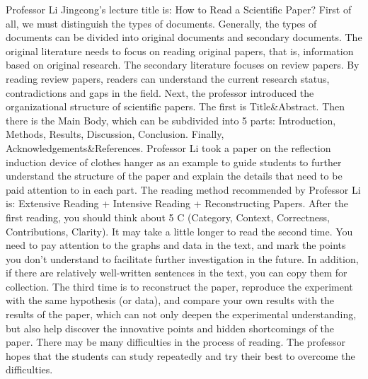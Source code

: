 
Professor Li Jingcong’s lecture title is: How to Read a Scientific Paper? First of all, we must distinguish the types of documents. Generally, the types of documents can be divided into original documents and secondary documents. The original literature needs to focus on reading original papers, that is, information based on original research. The secondary literature focuses on review papers. By reading review papers, readers can understand the current research status, contradictions and gaps in the field. Next, the professor introduced the organizational structure of scientific papers. The first is Title&Abstract. Then there is the Main Body, which can be subdivided into 5 parts: Introduction, Methods, Results, Discussion, Conclusion. Finally, Acknowledgements&References. Professor Li took a paper on the reflection induction device of clothes hanger as an example to guide students to further understand the structure of the paper and explain the details that need to be paid attention to in each part. The reading method recommended by Professor Li is: Extensive Reading + Intensive Reading + Reconstructing Papers. After the first reading, you should think about 5 C (Category, Context, Correctness, Contributions, Clarity). It may take a little longer to read the second time. You need to pay attention to the graphs and data in the text, and mark the points you don't understand to facilitate further investigation in the future. In addition, if there are relatively well-written sentences in the text, you can copy them for collection. The third time is to reconstruct the paper, reproduce the experiment with the same hypothesis (or data), and compare your own results with the results of the paper, which can not only deepen the experimental understanding, but also help discover the innovative points and hidden shortcomings of the paper. There may be many difficulties in the process of reading. The professor hopes that the students can study repeatedly and try their best to overcome the difficulties. 